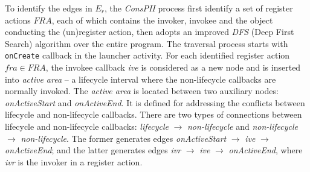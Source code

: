 To identify the edges in $E_r$, the \textit{ConsPII} process first identify a set of register actions $\mathit{FRA}$, each of which contains the invoker, invokee and the object conducting the (un)register action, then adopts an improved \textit{DFS} (Deep First Search) algorithm over the entire program. The traversal process starts with \texttt{onCreate} callback in the launcher activity. For each identified register action $\mathit{fra}\in \mathit{FRA}$, the invokee callback \textit{ive} is considered as a new node and is inserted into \textit{active area} -- a lifecycle interval where the non-lifecycle callbacks are normally invoked. The \textit{active area} is
located between two auxiliary nodes: \textit{onActiveStart} and \textit{onActiveEnd}. It is defined for addressing the conflicts between lifecycle and non-lifecycle callbacks. There are two types of connections between lifecycle and non-lifecycle callbacks: \textit{lifecycle} $\rightarrow $ \textit{non-lifecycle} and \textit{non-lifecycle} $\rightarrow $ \textit{non-lifecycle}. The former generates edges \textit{onActiveStart} $\rightarrow $ \textit{ive} $\rightarrow $ \textit{onActiveEnd}; and the latter generates edges \textit{ivr} $\rightarrow $ \textit{ive} $\rightarrow $ \textit{onActiveEnd}, where \textit{ivr} is the invoker in a register action. %


